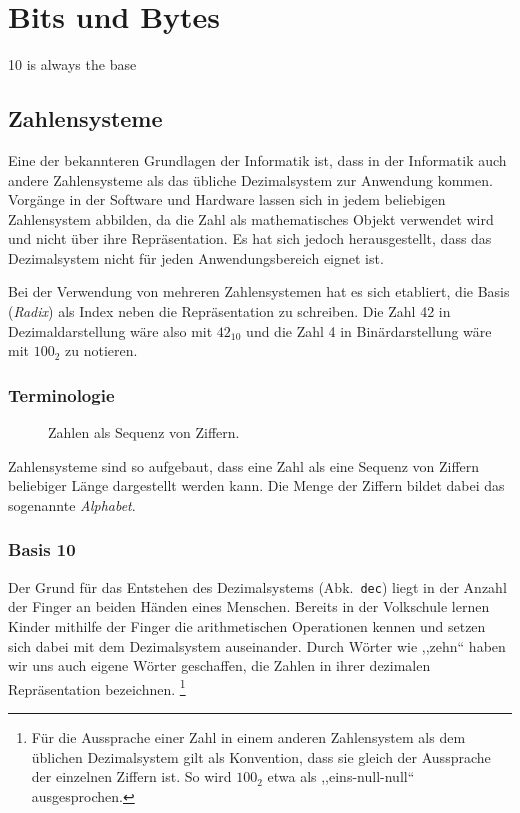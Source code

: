 \chapter{Bits und Bytes}
\epigraph{10 is always the base}{}
\newcommand{\short}[1]{Abk.~\texttt{#1}}
%
\section{Zahlensysteme}
%
Eine der bekannteren Grundlagen der Informatik ist, dass in der Informatik
auch andere Zahlensysteme als das übliche Dezimalsystem zur Anwendung kommen.
Vorgänge in der Software und Hardware lassen sich in jedem beliebigen
Zahlensystem abbilden, da die Zahl als mathematisches Objekt verwendet wird
und nicht über ihre Repräsentation. Es hat sich jedoch herausgestellt, dass das
Dezimalsystem nicht für jeden Anwendungsbereich eignet ist.

Bei der Verwendung von mehreren Zahlensystemen hat es sich etabliert,
die Basis (\emph{Radix}) als Index neben die Repräsentation zu schreiben.
Die Zahl 42 in Dezimaldarstellung wäre also mit $42_{10}$ und die Zahl 4
in Binärdarstellung wäre mit $100_2$ zu notieren.
%
\subsection{Terminologie}
%
\begin{figure}[ht]
  \begin{center}
  \end{center}
  \caption{Zahlen als Sequenz von Ziffern.}
  \label{fig:seq_digits}
\end{figure}

Zahlensysteme sind so aufgebaut, dass eine Zahl als eine Sequenz von Ziffern
beliebiger Länge dargestellt werden kann. Die Menge der Ziffern bildet dabei
das sogenannte \emph{Alphabet}.

\subsection{Basis 10}
\label{sec:bits_numeric_systems_10}
%
Der Grund für das Entstehen des Dezimalsystems (\short{dec}) liegt in der
Anzahl der Finger an beiden Händen eines Menschen. Bereits in der Volkschule
lernen Kinder mithilfe der Finger die arithmetischen Operationen kennen und
setzen sich dabei mit dem Dezimalsystem auseinander. Durch Wörter wie ,,zehn``
haben wir uns auch eigene Wörter geschaffen, die Zahlen in ihrer dezimalen
Repräsentation bezeichnen.%
\footnote{Für die Aussprache einer Zahl in einem anderen Zahlensystem als dem
üblichen Dezimalsystem gilt als Konvention, dass sie gleich der Aussprache der
einzelnen Ziffern ist. So wird $100_2$ etwa als ,,eins-null-null`` ausgesprochen.}

